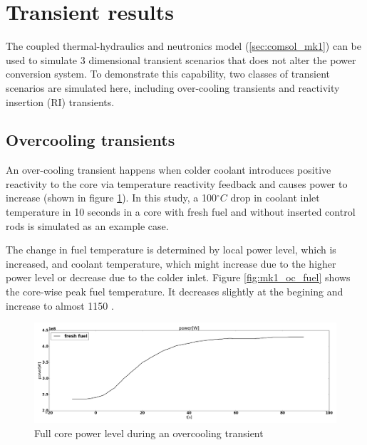 \documentclass{elsarticle}
\begin{document}





\newpage
\section{Transient results}
\label{sec:mk1_trans}

The coupled thermal-hydraulics and neutronics model (\ref{sec:comsol_mk1}) can be used to simulate 3 dimensional transient scenarios that does not alter the power conversion system. To demonstrate this capability, two classes of transient scenarios are simulated here, including  over-cooling transients and reactivity insertion (RI) transients.





\subsection{Overcooling transients}




An over-cooling transient happens when colder coolant introduces positive reactivity to the core via temperature reactivity feedback and causes power to increase (shown in figure \ref{fig:mk1_oc_power}). In this study, a 100$^{\circ}C$ drop in coolant inlet temperature in 10 seconds in a core with fresh fuel and without inserted control rods is simulated as an example case. 


The change in fuel temperature is determined by local power level, which is increased, and coolant temperature, which might increase due to the higher power level or decrease due to the colder inlet. Figure \ref{fig:mk1_oc_fuel} shows the core-wise peak fuel temperature. It decreases slightly at the begining and increase to almost 1150 \degc. 




\begin{figure}
    \centering
    \includegraphics[width=\textwidth]{images/diffusion/mk1/OC/power.png}
    \caption{Full core power level during an overcooling transient}
    \label{fig:mk1_oc_power}
\end{figure}
\end{document}
